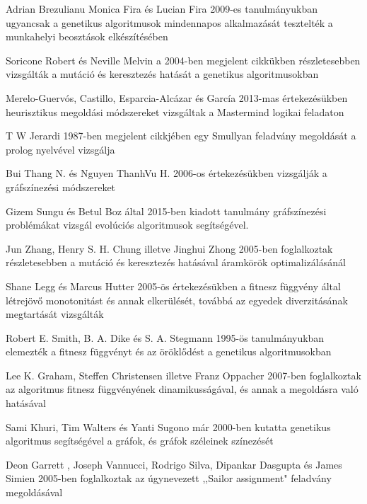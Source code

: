 \documentclass[12pt,a4paper,oneside]{report}
\begin{document}
Adrian Brezulianu Monica Fira és Lucian Fira 2009-es tanulmányukban ugyancsak a genetikus algoritmusok mindennapos alkalmazását tesztelték a munkahelyi beosztások elkészítésében\cite{Brezulianu:2009:GAA:1644993.1645085}

Soricone Robert és Neville Melvin a 2004-ben megjelent cikkükben részletesebben vizsgálták a mutáció és keresztezés hatását a genetikus algoritmusokban\cite{Soricone:2004:CAG:1046191.1032304}

Merelo-Guervós, Castillo, Esparcia-Alcázar és García 2013-mas értekezésükben heurisztikus megoldási módszereket vizsgáltak a Mastermind logikai feladaton\cite{Merelo-Guervos:2013:IES:2463372.2463473}

T W Jerardi	1987-ben megjelent cikkjében egy Smullyan feladvány megoldását a prolog nyelvével vizsgálja\cite{Jerardi:1987:PPL:24714.24722}

Bui Thang N. és Nguyen ThanhVu H. 2006-os értekezésükben vizsgálják a gráfszínezési módszereket\cite{Bui:2006:AAG:1143997.1144001}

Gizem Sungu és Betul Boz által 2015-ben kiadott tanulmány gráfszínezési problémákat vizsgál evolúciós algoritmusok segítségével.\cite{Sungu:2015:EAW:2739482.2768488}

Jun Zhang, Henry S. H. Chung illetve Jinghui Zhong 2005-ben foglalkoztak részletesebben a mutáció és keresztezés hatásával áramkörök optimalizálásánál\cite{Zhang:2005:ACM:1068009.1068267}

Shane Legg és Marcus Hutter 2005-ös értekezésükben a fitnesz függvény által létrejövő monotonitást és annak elkerülését, továbbá az egyedek diverzitásának megtartását vizsgálták\cite{Legg:2005:FUD:1068009.1068216}

Robert E. Smith, B. A. Dike és S. A. Stegmann	1995-ös tanulmányukban elemezték a fitnesz függvényt és az öröklődést a genetikus algoritmusokban\cite{Smith:1995:FIG:315891.316014}   

Lee K. Graham, Steffen Christensen illetve Franz Oppacher 2007-ben foglalkoztak az algoritmus fitnesz függvényének dinamikusságával, és annak a megoldásra való hatásával\cite{Graham:2007:SGA:1276958.1277243}

Sami Khuri, Tim Walters és Yanti Sugono már 2000-ben kutatta genetikus algoritmus segítségével a gráfok, és gráfok széleinek színezését\cite{Khuri:2000:GGA:335603.335880}

Deon Garrett	, Joseph Vannucci, Rodrigo Silva, Dipankar Dasgupta és James Simien 2005-ben foglalkoztak az úgynevezett ,,Sailor assignment" feladvány megoldásával\cite{Garrett:2005:GAS:1068009.1068333}
\end{document}
